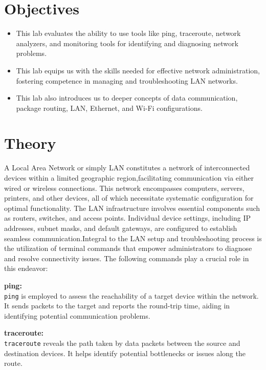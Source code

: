 \documentclass[11pt]{report}
\begin{document}
\section{Objectives}
\begin{itemize}
    \item This lab evaluates the ability to use tools like ping, traceroute, network analyzers, and monitoring tools for identifying and diagnosing network problems.
    \item This lab equips us with the skills needed for effective network administration, fostering competence in managing and troubleshooting LAN networks.
    \item This lab also introduces us to deeper concepts of data communication, package routing, LAN, Ethernet, and Wi-Fi configurations.
\end{itemize}
\section{Theory}
A Local Area Network or simply LAN constitutes a network of 
interconnected devices within a limited geographic region,facilitating communication via either wired or wireless connections. 
This network encompasses computers, servers, 
printers, and other devices, all of which necessitate systematic configuration for optimal functionality.
The LAN infrastructure involves essential components such as routers, switches, and access points. Individual device settings, including IP addresses, subnet masks, and default gateways, 
are configured to establish seamless communication.Integral to the LAN setup and troubleshooting process is 
the utilization of terminal commands that empower administrators to diagnose and resolve connectivity issues.
The following commands play a crucial role in this endeavor:

\vspace{\baselineskip}
\textbf{ping:} \\
\texttt{ping} is employed to assess the reachability of a target device within the network. It sends packets to the target and reports the round-trip time, aiding in identifying potential communication problems.

\vspace{\baselineskip}
\vspace{\baselineskip}

\textbf{traceroute:} \\
\texttt{traceroute} reveals the path taken by data packets between the source and destination devices. It helps identify potential bottlenecks or issues along the route.
\end{document}
